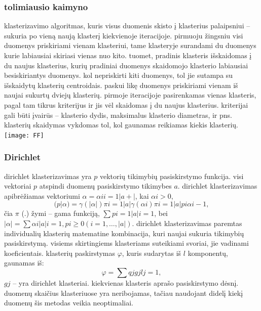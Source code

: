\documentclass{VUMIFInfKursinis}
\begin{document}
		\subsubsection{tolimiausio kaimyno}
			klasterizavimo algoritmas, kuris visus duomenis skisto į klasterius palaipsniui – sukuria po vieną naują klasterį kiekvienoje iteracijoje. pirmuoju žingsniu visi duomenys priskiriami vienam klasteriui, tame klasteryje surandami du duomenys kurie labiausiai skiriasi vienas nuo kito. tuomet, pradinis klasteris išskaidomas į du naujus klasterius, kurių pradiniai duomenys skaidomojo klasterio labiausiai besiskiriantys duomenys. kol nepriskirti kiti duomenys, tol jie sutampa su išskaidytų klasterių centroidais. paskui likę duomenys priskiriami vienam iš naujai sukurtų dviejų klasterių. pirmoje iteracijoje pasirenkamas vienas klasteris, pagal tam tikrus kriterijus ir jis vėl skaidomas į du naujus klasterius. kriterijai gali būti įvairūs – klasterio dydis, maksimalus klasterio diametras, ir pns. klasterių skaidymas vykdomas tol, kol gaunamas reikiamas kiekis klasterių.\\
			\texttt{[image: FF]}

		\subsubsection{Dirichlet}
			dirichlet klasterizavimas yra $p$ vektorių tikimybių pasiskirstymo funkcija. visi vektoriai $p$ atspindi duomenų pasiskirstymo tikimybes $a$. dirichlet klasterizavimas apibrėžiamas vektoriumi $ \alpha = {\alpha i}i=1|a+|$, kai $ \alpha i > 0$,\\
			\begin{equation}
				(p|\alpha)=\gamma(|\alpha|)\pi i=1|a|\gamma (\alpha i)\pi i=1|a|pi \alpha i−1,
			\end{equation}
			čia $\pi$ (.) žymi – gama funkciją, $\sum{pi=1|a|i=1}$, bei $|\alpha| = \sum{\alpha i|a|i=1,pi≥0} (i =1,\ldots,|a|)$.
			dirichlet klasterizavimas paremtas individualių klasterių matematine kombinacija, kuri naujai sukuria tikimybių pasiskirstymą. visiems skirtingiems klasteriams suteikiami svoriai, jie vadinami koeficientais. klasterių paskirstymas $\varphi$, kuris sudarytas iš $l$ komponentų, gaunamas iš:
			\begin{equation}
				\varphi = \sum{qjgjlj=1},
			\end{equation}
			$gj$ – yra dirichlet klasteriai. kiekvienas klasteris aprašo pasiskirstymo dėsnį. duomenų skaičius klasteriuose yra neribojamas, tačiau naudojant didelį kiekį duomenų šis metodas veikia neoptimaliai.
\end{document}
